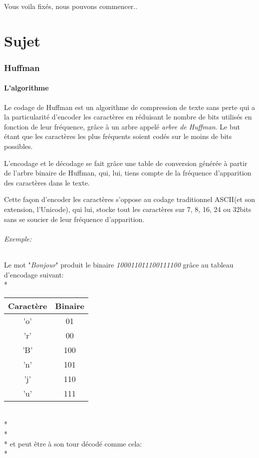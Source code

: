 \documentclass[12pt, letterpaper, twoside]{article}
\begin{document}
Vous voila fixés, nous pouvons commencer..

\newpage

\part{Sujet}
 
\section{Huffman}
\subsection{L'algorithme}

Le codage de Huffman est un algorithme de compression de texte sans perte qui a la particularité d'encoder les caractères en réduisant le nombre de bits utilisés en fonction de leur fréquence, grâce à un arbre appelé \textit{arbre de Huffman}.
Le but étant que les caractères les plus fréquents soient codés sur le moins de bits possibles.

L'encodage et le décodage se fait grâce une table de conversion générée à partir de l'arbre binaire de Huffman, qui, lui, tiens compte de la fréquence d'apparition des caractères dans le texte.

Cette façon d'encoder les caractères s'oppose au codage traditionnel ASCII(et son extension, l'Unicode), qui lui, stocke tout les caractères sur 7, 8, 16, 24 ou 32bits sans se soucier de leur fréquence d'apparition.

\paragraph{Exemple:}
Le mot "\textit{Bonjour}" produit le binaire \textit{100011011100111100} grâce au tableau d'encodage suivant:\\*

\begin{tabular}{ c | c }
    Caractère & Binaire \\
    \hline
    'o' & 01 \\
    'r' & 00 \\
    'B' & 100 \\
    'n' & 101 \\
    'j' & 110 \\
    'u' & 111 \\
\end{tabular} \\* \\* \\*
et peut être à son tour décodé comme cela:\\*
\end{document}
